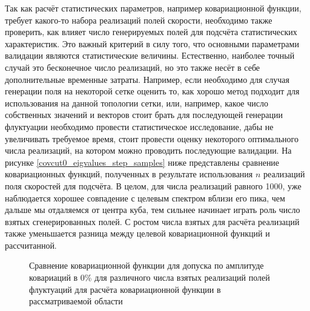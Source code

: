 Так как расчёт статистических параметров, например ковариационной функции, требует какого-то набора реализаций полей скорости, необходимо также проверить, как влияет число генерируемых полей для подсчёта статистических характеристик. Это важный критерий в силу того, что основными параметрами валидации являются статистические величины. Естественно, наиболее точный случай это бесконечное число реализаций, но это также несёт в себе дополнительные временные затраты. Например, если необходимо для случая генерации поля на некоторой сетке оценить то, как хорошо метод подходит для использования на данной топологии сетки, или, например, какое число собственных значений и векторов стоит брать для последующей генерации флуктуации необходимо провести статистическое исследование, дабы не увеличивать требуемое время, стоит провести оценку некоторого оптимального числа реализаций, на котором можно проводить последующие валидации. На рисунке \ref{covcut0_eigvalues_step_samples} ниже представлены сравнение ковариационных функций, полученных в результате использования $n$ реализаций поля скоростей для подсчёта. В целом, для числа реализаций равного 1000, уже наблюдается хорошее совпадение с целевым спектром вблизи его пика, чем дальше мы отдаляемся от центра куба, тем сильнее начинает играть роль число взятых сгенерированных полей. С ростом числа взятых для расчёта реализаций также уменьшается разница между целевой ковариационной функций и рассчитанной.

\begin{figure}[!h]
    
    \caption{Сравнение ковариационной функции для допуска по амплитуде ковариаций в 0\% для различного числа взятых реализаций полей флуктуаций для расчёта ковариационной функции в рассматриваемой области}
    \label{img:covcut0_eigvalues_step_samples}  
\end{figure}

